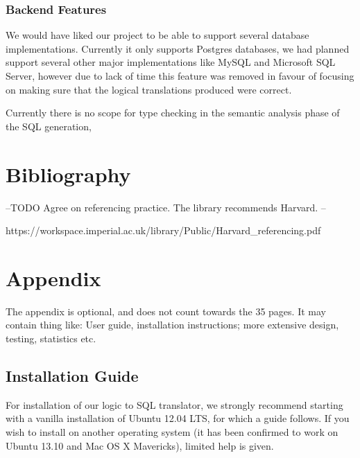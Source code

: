 \documentclass[a4paper, 11pt]{article}
\begin{document}
    
    \subsubsection{Backend Features} 
    We would have liked our project to be able to support several database
    implementations. Currently it only supports Postgres databases, we had
    planned support several other major implementations like MySQL and
    Microsoft SQL Server, however due to lack of time this feature was removed
    in favour of focusing on making sure that the logical translations produced
    were correct. 
   
    Currently there is no scope for type checking in the semantic analysis phase
    of the SQL generation,

   
    

\section{Bibliography}
  \printbibliography

  --TODO Agree on referencing practice. The library recommends Harvard. --

  https://workspace.imperial.ac.uk/library/Public/Harvard\_referencing.pdf

\appendix
\section{Appendix}
  The appendix is optional, and does not count towards the 35 pages. It may
  contain thing like: User guide, installation instructions; more extensive
  design, testing, statistics etc.

  \subsection{Installation Guide}
    For installation of our logic to SQL translator, we strongly recommend
    starting with a vanilla installation of Ubuntu 12.04 LTS, for which a guide
    follows. If you wish to install on another operating system (it has been 
    confirmed to work on Ubuntu 13.10 and Mac OS X Mavericks),
    limited help is given.
\end{document}
